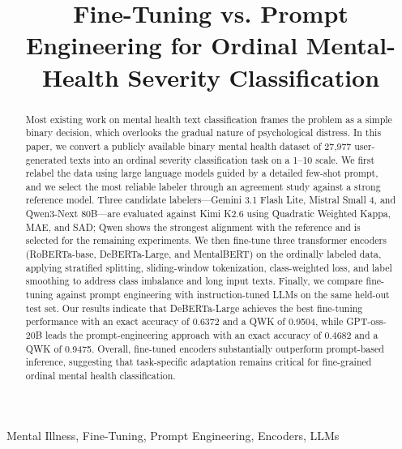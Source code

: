 \documentclass[conference]{IEEEtran}
\makeatletter
\let\end\a@l@end
\makeatother
\begin{document}
\title{Fine-Tuning vs. Prompt Engineering for Ordinal Mental-Health Severity Classification}


\maketitle

\begin{abstract}
Most existing work on mental health text classification frames the problem as a simple binary decision, which overlooks the gradual nature of psychological distress. In this paper, we convert a publicly available binary mental health dataset of 27,977 user-generated texts into an ordinal severity classification task on a 1--10 scale. We first relabel the data using large language models guided by a detailed few-shot prompt, and we select the most reliable labeler through an agreement study against a strong reference model. Three candidate labelers---Gemini 3.1 Flash Lite, Mistral Small 4, and Qwen3-Next 80B---are evaluated against Kimi K2.6 using Quadratic Weighted Kappa, MAE, and SAD; Qwen shows the strongest alignment with the reference and is selected for the remaining experiments. We then fine-tune three transformer encoders (RoBERTa-base, DeBERTa-Large, and MentalBERT) on the ordinally labeled data, applying stratified splitting, sliding-window tokenization, class-weighted loss, and label smoothing to address class imbalance and long input texts. Finally, we compare fine-tuning against prompt engineering with instruction-tuned LLMs on the same held-out test set. Our results indicate that DeBERTa-Large achieves the best fine-tuning performance with an exact accuracy of 0.6372 and a QWK of 0.9504, while GPT-oss-20B leads the prompt-engineering approach with an exact accuracy of 0.4682 and a QWK of 0.9475. Overall, fine-tuned encoders substantially outperform prompt-based inference, suggesting that task-specific adaptation remains critical for fine-grained ordinal mental health classification.
\end{abstract}

\begin{IEEEkeywords}
Mental Illness, Fine-Tuning, Prompt Engineering, Encoders, LLMs
\end{IEEEkeywords}


\end{document}
